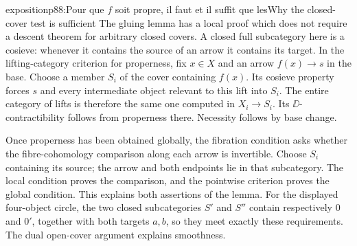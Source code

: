 \begin{dcomment}{exposition}{p88:Pour que $f$ soit propre, il faut et il suffit que les}{Why the closed-cover test is sufficient}
The gluing lemma has a local proof which does not require a descent theorem for arbitrary closed covers. A closed full subcategory here is a cosieve: whenever it contains the source of an arrow it contains its target. In the lifting-category criterion for properness, fix $x\in X$ and an arrow $f(x)\to s$ in the base. Choose a member $S_i$ of the cover containing $f(x)$. Its cosieve property forces $s$ and every intermediate object relevant to this lift into $S_i$. The entire category of lifts is therefore the same one computed in $X_i\to S_i$. Its $\DD$-contractibility follows from properness there. Necessity follows by base change.

Once properness has been obtained globally, the fibration condition asks whether the fibre-cohomology comparison along each arrow is invertible. Choose $S_i$ containing its source; the arrow and both endpoints lie in that subcategory. The local condition proves the comparison, and the pointwise criterion proves the global condition. This explains both assertions of the lemma. For the displayed four-object circle, the two closed subcategories $S'$ and $S''$ contain respectively $0$ and $0'$, together with both targets $a,b$, so they meet exactly these requirements. The dual open-cover argument explains smoothness.
\end{dcomment}

